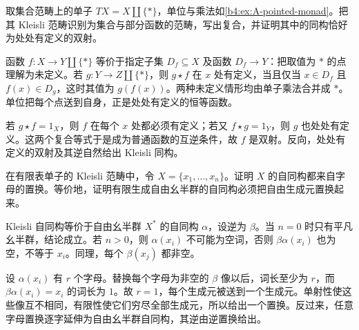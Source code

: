 \begin{exercise}\label{b4:ex:A-kleisli-partial-functions}
	取集合范畴上的单子 \(TX=X\amalg\{*\}\)，单位与乘法如\cref{b4:ex:A-pointed-monad}。把其 Kleisli 范畴识别为集合与部分函数的范畴，写出复合，并证明其中的同构恰好为处处有定义的双射。
\end{exercise}
\begin{solution}
	函数 \(f:X\to Y\amalg\{*\}\) 等价于指定子集 \(D_f\subseteq X\) 及函数 \(D_f\to Y\)：把取值为 \(*\) 的点理解为未定义。若 \(g:Y\to Z\amalg\{*\}\)，则 \(g\star f\) 在 \(x\) 处有定义，当且仅当 \(x\in D_f\) 且 \(f(x)\in D_g\)，这时其值为 \(g(f(x))\)。两种未定义情形均由单子乘法合并成 \(*\)。单位把每个点送到自身，正是处处有定义的恒等函数。

	若 \(g\star f=1_X\)，则 \(f\) 在每个 \(x\) 处都必须有定义；若又 \(f\star g=1_Y\)，则 \(g\) 也处处有定义。这两个复合等式于是成为普通函数的互逆条件，故 \(f\) 是双射。反向，处处有定义的双射及其逆自然给出 Kleisli 同构。
\end{solution}

\begin{exercise}\label{b4:ex:A-kleisli-free-monoid-automorphisms}
	在有限表单子的 Kleisli 范畴中，令 \(X=\{x_1,\ldots,x_n\}\)。证明 \(X\) 的自同构都来自字母的置换。等价地，证明有限生成自由幺半群的自同构必须把自由生成元置换起来。
\end{exercise}
\begin{solution}
	Kleisli 自同构等价于自由幺半群 \(X^*\) 的自同构 \(\alpha\)，设逆为 \(\beta\)。当 \(n=0\) 时只有平凡幺半群，结论成立。若 \(n>0\)，则 \(\alpha(x_i)\) 不可能为空词，否则 \(\beta\alpha(x_i)\) 也为空，不等于 \(x_i\)。同理，每个 \(\beta(x_j)\) 都非空。

	设 \(\alpha(x_i)\) 有 \(r\) 个字母。替换每个字母为非空的 \(\beta\) 像以后，词长至少为 \(r\)，而 \(\beta\alpha(x_i)=x_i\) 的词长为 \(1\)。故 \(r=1\)，每个生成元被送到一个生成元。单射性使这些像互不相同，有限性使它们穷尽全部生成元，所以给出一个置换。反过来，任意字母置换逐字延伸为自由幺半群自同构，其逆由逆置换给出。
\end{solution}

